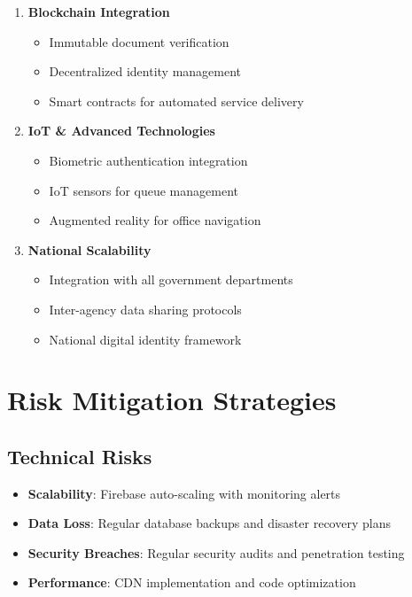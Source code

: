 \documentclass[11pt,a4paper]{article}
\begin{document}
\begin{enumerate}[leftmargin=*]
    \item \textbf{Blockchain Integration}
    \begin{itemize}
        \item Immutable document verification
        \item Decentralized identity management
        \item Smart contracts for automated service delivery
    \end{itemize}
    
    \item \textbf{IoT \& Advanced Technologies}
    \begin{itemize}
        \item Biometric authentication integration
        \item IoT sensors for queue management
        \item Augmented reality for office navigation
    \end{itemize}
    
    \item \textbf{National Scalability}
    \begin{itemize}
        \item Integration with all government departments
        \item Inter-agency data sharing protocols
        \item National digital identity framework
    \end{itemize}
\end{enumerate}

\section{Risk Mitigation Strategies}

\subsection{Technical Risks}

\begin{itemize}
    \item \textbf{Scalability}: Firebase auto-scaling with monitoring alerts
    \item \textbf{Data Loss}: Regular database backups and disaster recovery plans
    \item \textbf{Security Breaches}: Regular security audits and penetration testing
    \item \textbf{Performance}: CDN implementation and code optimization
\end{itemize}
\end{document}
